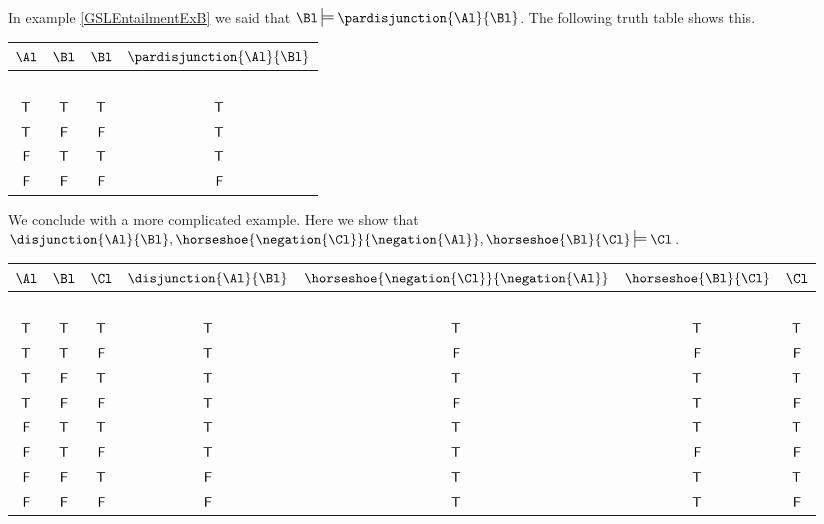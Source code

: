 \begin{majorILnc}{}
In example \ref{GSLEntailmentExB} we said that $\Bl\sdtstile{}{}\pardisjunction{\Al}{\Bl}$. 
The following truth table shows this. 
\begin{center}
\begin{tabular}{ c c c c }
$\Al$ & $\Bl$ & $\Bl$ & $\pardisjunction{\Al}{\Bl}$ \\
\hline
$ $ & $ $ & & \\[-.25cm]
$\mathsf{T}$ & $\mathsf{T}$ & $\mathsf{T}$ & $\mathsf{T}$ \\
$\mathsf{T}$ & $\mathsf{F}$& $\mathsf{F}$ & $\mathsf{T}$ \\
$\mathsf{F}$ & $\mathsf{T}$ & $\mathsf{T}$ & $\mathsf{T}$ \\
$\mathsf{F}$ & $\mathsf{F}$  & $\mathsf{F}$ & $\mathsf{F}$ \\
\end{tabular}
\end{center}
\end{majorILnc}
\begin{majorILnc}{}
We conclude with a more complicated example. 
Here we show that $\disjunction{\Al}{\Bl},\horseshoe{\negation{\Cl}}{\negation{\Al}},\horseshoe{\Bl}{\Cl}\sdtstile{}{}\Cl$.
\begin{center}
\begin{tabular}{ c c c c c c c }
$\Al$ & $\Bl$ & $\Cl$ & $\disjunction{\Al}{\Bl}$ & $\horseshoe{\negation{\Cl}}{\negation{\Al}}$ & $\horseshoe{\Bl}{\Cl}$ & $\Cl$ \\
\hline
$ $ & $ $ & & & & & \\[-.25cm]
$\mathsf{T}$ & $\mathsf{T}$ & $\mathsf{T}$ & $\mathsf{T}$ & $\mathsf{T}$ & $\mathsf{T}$ & $\mathsf{T}$\\
$\mathsf{T}$ & $\mathsf{T}$ & $\mathsf{F}$& $\mathsf{T}$ & $\mathsf{F}$ & $\mathsf{F}$ &  $\mathsf{F}$\\
$\mathsf{T}$ & $\mathsf{F}$ & $\mathsf{T}$ & $\mathsf{T}$ & $\mathsf{T}$ & $\mathsf{T}$ &  $\mathsf{T}$\\
$\mathsf{T}$ & $\mathsf{F}$ & $\mathsf{F}$  & $\mathsf{T}$ & $\mathsf{F}$ & $\mathsf{T}$ & $\mathsf{F}$\\
$\mathsf{F}$ & $\mathsf{T}$ & $\mathsf{T}$ & $\mathsf{T}$ & $\mathsf{T}$ & $\mathsf{T}$ & $\mathsf{T}$\\
$\mathsf{F}$ & $\mathsf{T}$ & $\mathsf{F}$& $\mathsf{T}$ & $\mathsf{T}$ & $\mathsf{F}$ & $\mathsf{F}$\\
$\mathsf{F}$ & $\mathsf{F}$ & $\mathsf{T}$ & $\mathsf{F}$ & $\mathsf{T}$ & $\mathsf{T}$ & $\mathsf{T}$\\
$\mathsf{F}$ & $\mathsf{F}$ & $\mathsf{F}$  & $\mathsf{F}$ & $\mathsf{T}$ & $\mathsf{T}$ & $\mathsf{F}$\\
\end{tabular}
\end{center}
\end{majorILnc}

